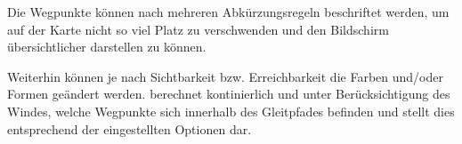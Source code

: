 %

Die Wegpunkte können nach mehreren Abkürzungsregeln beschriftet werden, um auf  der Karte nicht so viel Platz zu verschwenden und den Bildschirm  übersichtlicher darstellen zu können. 

Weiterhin können je nach Sichtbarkeit bzw. Erreichbarkeit die Farben und/oder Formen geändert werden.%
\xc berechnet kontinierlich und unter Berücksichtigung des Windes, welche Wegpunkte sich innerhalb des Gleitpfades befinden und stellt dies entsprechend der eingestellten Optionen dar.

